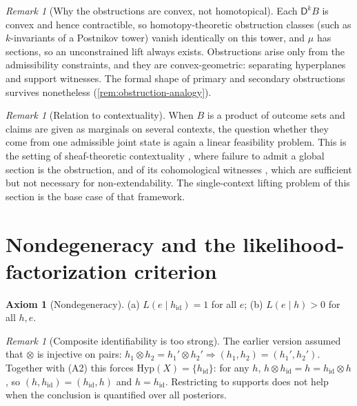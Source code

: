 \documentclass[11pt]{article}
\theoremstyle{definition}
\newtheorem{axiom}[theorem]{Axiom}
\theoremstyle{remark}
\newtheorem{remark}[theorem]{Remark}
\newcommand{\D}{\mathsf{D}}
\newcommand{\Hyp}{\mathrm{Hyp}}
\newcommand{\hid}{h_{\mathrm{id}}}
\begin{document}
\begin{remark}[Why the obstructions are convex, not homotopical]
Each $\D^kB$ is convex and hence contractible, so homotopy-theoretic obstruction classes (such as
$k$-invariants of a Postnikov tower) vanish identically on this tower, and $\mu$ has sections, so an
unconstrained lift always exists. Obstructions arise only from the admissibility constraints, and they
are convex-geometric: separating hyperplanes and support witnesses. The formal shape of primary and
secondary obstructions survives nonetheless (\cref{rem:obstruction-analogy}).
\end{remark}

\begin{remark}[Relation to contextuality]
When $B$ is a product of outcome sets and claims are given as marginals on several contexts, the
question whether they come from one admissible joint state is again a linear feasibility problem.
This is the setting of sheaf-theoretic contextuality \cite{AbramskyBrandenburger2011}, where failure to
admit a global section is the obstruction, and of its cohomological witnesses
\cite{AbramskyMansfieldBarbosa2012}, which are sufficient but not necessary for non-extendability. The
single-context lifting problem of this section is the base case of that framework.
\end{remark}

\section{Nondegeneracy and the likelihood-factorization criterion}

\begin{axiom}[Nondegeneracy]\label{ax:nondeg}
(a) $L(e\mid\hid)=1$ for all $e$; (b) $L(e\mid h)>0$ for all $h,e$.
\end{axiom}

\begin{remark}[Composite identifiability is too strong]\label{rem:ci}
The earlier version assumed that $\otimes$ is injective on pairs:
$h_1\otimes h_2=h_1'\otimes h_2'\Rightarrow(h_1,h_2)=(h_1',h_2')$. Together with (A2) this forces
$\Hyp(X)=\{\hid\}$: for any $h$, $h\otimes\hid=h=\hid\otimes h$, so $(h,\hid)=(\hid,h)$ and $h=\hid$.
Restricting to supports does not help when the conclusion is quantified over all posteriors.
\end{remark}
\end{document}
